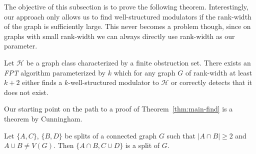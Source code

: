 \documentclass{llncs}
\def\HH{{\mathcal H}}
\def\wsm{well-structured modulator}
\begin{document}
The objective of this subsection is to prove the following theorem. Interestingly, our approach only allows us to find \wsm s if the rank-width of the graph is sufficiently large. This never becomes a problem though, since on graphs with small rank-width we can always directly use rank-width as our parameter.\sv{\enlargethispage*{8mm}}

\begin{theorem}
\label{thm:main-find}
Let $\HH$ be a graph class characterized by a finite obstruction set. There exists an \emph{FPT} algorithm parameterized by $k$ which for any graph $G$ of rank-width at least $k+2$ either finds a $k$-{\wsm} to $\HH$ or correctly detects that it does not exist. 
\end{theorem}

{Our starting point on the path to a proof of Theorem~\ref{thm:main-find} is a theorem by Cunningham.}

\begin{theorem}\label{thm:splitintersection}
Let $\{ A, C\}$, $\{ B, D\}$ be splits of a connected graph $G$ such that $|A\cap B|\ge 2$  and
$A \cup B\neq V(G)$. Then $\{A\cap B, C\cup D\}$ is a split of $G$.
\end{theorem}
\end{document}
